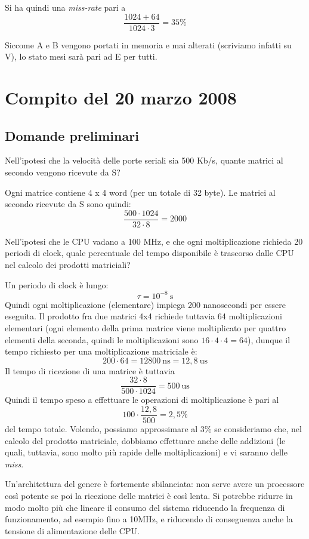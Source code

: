 Si ha quindi una \textit{miss-rate} pari a 
\[
\dfrac{1024+64}{1024\cdot 3} = 35\%
\]

Siccome A e B vengono portati in memoria e mai alterati (scriviamo infatti su V), lo stato mesi sarà pari ad E per tutti.

\section{Compito del 20 marzo 2008}
\label{sec:20mar08}

\subsection{Domande preliminari}

\textsf{Nell'ipotesi che la velocità delle porte seriali sia 500 Kb/s, quante matrici al secondo
vengono ricevute da S?}

Ogni matrice contiene 4 x 4 word (per un totale di 32 byte). 
Le matrici al secondo ricevute da S sono quindi:
\[
\dfrac{500\cdot 1024}{32\cdot 8}=2000
\]

\textsf{Nell'ipotesi che le CPU vadano a 100 MHz, e che ogni moltiplicazione richieda 20
periodi di clock, quale percentuale del tempo disponibile è trascorso dalle CPU nel
calcolo dei prodotti matriciali?}

Un periodo di clock è lungo:
\[
\tau = 10^{-8} ~\text{s}
\]
Quindi ogni moltiplicazione (elementare) impiega 200 nanosecondi per essere eseguita. Il prodotto fra due matrici 4x4 richiede tuttavia 64 moltiplicazioni elementari (ogni elemento della prima matrice viene moltiplicato per quattro elementi della seconda, quindi le moltiplicazioni sono $16 \cdot 4 \cdot 4 = 64$), dunque il tempo richiesto per una moltiplicazione matriciale è:
\[
200 \cdot 64 = 12800 ~\text{ns} = 12,8 ~\text{us} 
\]
Il tempo di ricezione di una matrice è tuttavia 
\[
\dfrac{32 \cdot 8}{500\cdot 1024}= 500 ~\text{us} 
\]
Quindi il tempo speso a effettuare le operazioni di moltiplicazione è pari al 
\[
100 \cdot \dfrac{12,8}{500}= 2,5 \%
\]
del tempo totale. Volendo, possiamo approssimare al 3\% se consideriamo che, nel calcolo del prodotto matriciale, dobbiamo effettuare anche delle addizioni (le quali, tuttavia, sono molto più rapide delle moltiplicazioni) e vi saranno delle \textit{miss}.

Un'architettura del genere è fortemente sbilanciata: non serve avere un processore così potente se poi la ricezione delle matrici è così lenta. Si potrebbe ridurre in modo molto più che lineare il consumo del sistema riducendo la frequenza di funzionamento, ad esempio fino a 10MHz, e riducendo di conseguenza anche la tensione di alimentazione delle CPU.


